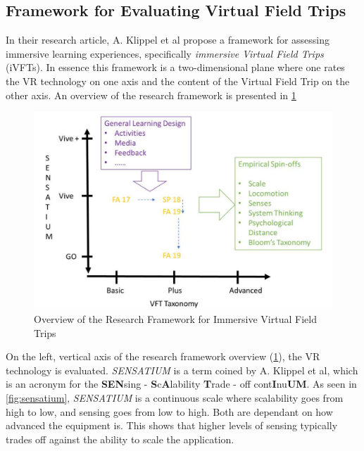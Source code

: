     \subsection{Framework for Evaluating Virtual Field Trips}
        \label{sec:framework}
        In their research article, A. Klippel et al \cite{research_framework} propose a framework for assessing immersive learning experiences, specifically \emph{immersive Virtual Field Trips} (iVFTs). In essence this framework is a two-dimensional plane where one rates the VR technology on one axis and the content of the Virtual Field Trip on the other axis. An overview of the research framework is presented in \cref{fig:framework}
        
        \FloatBarrier
        \begin{figure}[!ht]
            \centering
            \includegraphics[width=0.7\linewidth]{figures/framework_3.PNG}
            \caption{Overview of the Research Framework for Immersive Virtual Field Trips}
            \label{fig:framework}
        \end{figure}
        \FloatBarrier
        
        On the left, vertical axis of the research framework overview (\cref{fig:framework}), the VR technology is evaluated. \emph{SENSATIUM} is a term coined by A. Klippel et al, which is an acronym for the \textbf{SEN}sing - \textbf{S}c\textbf{A}lability \textbf{T}rade - off cont\textbf{I}nu\textbf{UM}. As seen in \cref{fig:sensatium}, \emph{SENSATIUM} is a continuous scale where scalability goes from high to low, and sensing goes from low to high. Both are dependant on how advanced the equipment is. This shows that higher levels of sensing typically trades off against the ability to scale the application.
        
